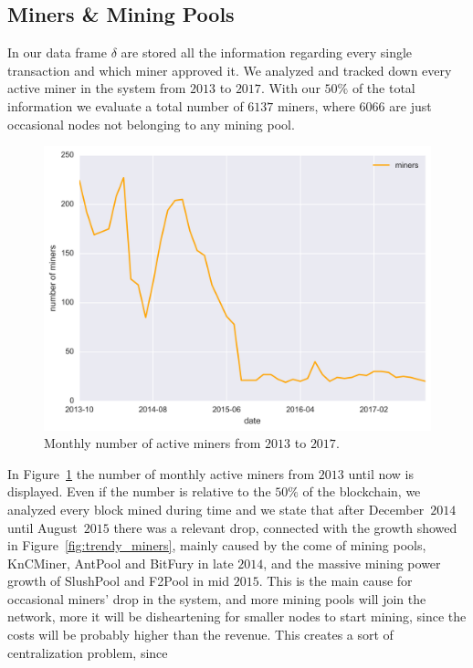 \documentclass[USenglish]{uit-thesis}
\begin{document}
\subsection{Miners \& Mining Pools}
\label{sec:minersminingpools}
In our data frame $\delta$ are stored all the information regarding
every single transaction and which miner approved it. We analyzed and
tracked down every active miner in the system from $2013$ to $2017$.
With our $50\%$ of the total information we evaluate a total number
of $6137$ miners, where $6066$ are just occasional nodes not belonging
to any mining pool.
\begin{figure}[h]
	\centering
	\includegraphics[width=1\textwidth]{img/number_of_miners}
	\caption{Monthly number of active miners from $2013$ to $2017$.}
	\label{fig:number_of_miners}
\end{figure}
In Figure~\ref{fig:number_of_miners} the number
of monthly active miners from $2013$ until now is displayed.
Even if the number is relative to the $50\%$ of the
blockchain, we analyzed every block mined during time and we state
that after December~$2014$ until August~$2015$
there was a relevant drop, connected with the growth
showed in Figure~\ref{fig:trendy_miners}, mainly caused by the come of mining
pools, KnCMiner, AntPool and BitFury in late $2014$, and the massive
mining power growth of SlushPool and F2Pool in mid $2015$.
This is the main cause for occasional miners' drop in the system,
and more mining pools will join the network, more it will be
disheartening for smaller nodes to start mining, since the costs
will be probably higher than the revenue.
This creates a sort of centralization problem, since
\end{document}
